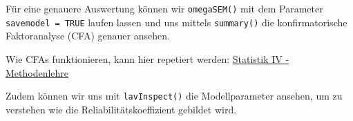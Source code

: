 \documentclass[
  letterpaper,
  DIV=11,
  numbers=noendperiod]{scrreprt}
\newenvironment{Shaded}{\begin{snugshade}}{\end{snugshade}}
\newcommand{\AttributeTok}[1]{\textcolor[rgb]{0.40,0.45,0.13}{#1}}
\newcommand{\ConstantTok}[1]{\textcolor[rgb]{0.56,0.35,0.01}{#1}}
\newcommand{\FunctionTok}[1]{\textcolor[rgb]{0.28,0.35,0.67}{#1}}
\newcommand{\NormalTok}[1]{\textcolor[rgb]{0.00,0.23,0.31}{#1}}
\newcommand{\OtherTok}[1]{\textcolor[rgb]{0.00,0.23,0.31}{#1}}
\newcommand{\SpecialCharTok}[1]{\textcolor[rgb]{0.37,0.37,0.37}{#1}}
\newcommand{\StringTok}[1]{\textcolor[rgb]{0.13,0.47,0.30}{#1}}
\begin{document}
Für eine genauere Auswertung können wir \texttt{omegaSEM()} mit dem
Parameter \texttt{savemodel\ =\ TRUE} laufen lassen und uns mittels
\texttt{summary()} die konfirmatorische Faktoranalyse (CFA) genauer
ansehen.

Wie CFAs funktionieren, kann hier repetiert werden:
\href{https://methodenlehre.github.io/statistik-IV/chapters/CFA.html}{Statistik
IV - Methodenlehre}

Zudem können wir uns mit \texttt{lavInspect()} die Modellparameter
ansehen, um zu verstehen wie die Reliabilitätskoeffizient gebildet wird.

\begin{Shaded}
\end{Shaded}
\end{document}

